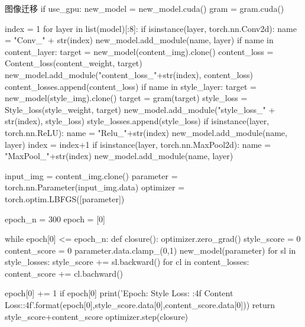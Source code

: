 \documentclass[openbib]{article}
\begin{document}
\begin{Python}{图像迁移}
	if use_gpu:
	new_model = new_model.cuda()
	gram = gram.cuda()
	
	index = 1
	for layer in list(model)[:8]:
	if isinstance(layer, torch.nn.Conv2d):
	name = "Conv_" + str(index)
	new_model.add_module(name, layer)
	if name in content_layer:
	target = new_model(content_img).clone()
	content_loss = Content_loss(content_weight, target)
	new_model.add_module("content_loss_"+str(index), content_loss)
	content_losses.append(content_loss)
	if name in style_layer:
	target = new_model(style_img).clone()
	target = gram(target)
	style_loss = Style_loss(style_weight, target)
	new_model.add_module("style_loss_" + str(index), style_loss)
	style_losses.append(style_loss)
	if isinstance(layer, torch.nn.ReLU):
	name = "Relu_"+str(index)
	new_model.add_module(name, layer)
	index = index+1
	if isinstance(layer, torch.nn.MaxPool2d):
	name = "MaxPool_"+str(index)
	new_model.add_module(name, layer)
	
	input_img = content_img.clone()
	parameter = torch.nn.Parameter(input_img.data)
	optimizer = torch.optim.LBFGS([parameter])
	
	epoch_n = 300
	epoch = [0]
	
	while epoch[0] <= epoch_n:
	def closure():
	optimizer.zero_grad()
	style_score = 0
	content_score = 0
	parameter.data.clamp_(0,1)
	new_model(parameter)
	for sl in style_losses:
	style_score += sl.backward()
	for cl in content_losses:
	content_score += cl.bachward()
	
	epoch[0] += 1
	if epoch[0] %
	print('Epoch:{} Style Loss: {:4f} Content Loss:{:4f}'.format(epoch[0],style_score.data[0],content_score.data[0]))
	return style_score+content_score
	optimizer.step(closure)
	
	
\end{Python}
	
\end{document}
